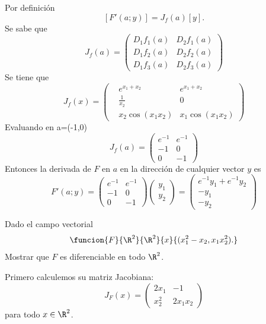 \documentclass[a4,11pt]{aleph-examen}
\begin{document}
\begin{preguntas}
\begin{respuesta}
\begin{respuesta}
\begin{respuesta} 
	Por definición
	\[
        [F'(a;y)]=J_f(a)[y].
    \]
	Se sabe que
    \[
        J_f(a)=\left( \begin{array}{lcr}
        D_{1}f_1(a)    &D_{2}f_1(a) \\
        D_{1}f_2(a)    &D_{2}f_2(a)\\
        D_{1}f_3(a)    &D_{2}f_3(a)
        \end{array}\right) 
    \]
    Se tiene que    
    \[
        J_f(x)= \begin{pmatrix}
        & e^{x_1+x_2}    &e^{x_1+x_2} \\
        & \frac{1}{x_2}  &0\\
        & x_2\cos(x_1x_2)    &x_1\cos(x_1x_2)
        \end{pmatrix} 
    \]
    Evaluando en a=(-1,0)
    \[
        J_f(a)= \begin{pmatrix}
        e^{-1} &e^{-1} \\
        -1     &0\\
        0      &-1
        \end{pmatrix}  
    \]
    Entonces la derivada de $F$ en $a$ en la dirección de cualquier vector $y$  es
    \[
        F'(a;y)= \begin{pmatrix}
        e^{-1} &e^{-1} \\
        -1     &0\\
        0      &-1
        \end{pmatrix}  
        \begin{pmatrix}
        y_1  \\
        y_2  
        \end{pmatrix}= 
        \begin{pmatrix}
        e^{-1}y_1+e^{-1}y_2\\
        -y_1     \\
        -y_2     
        \end{pmatrix} 
    \]
\end{respuesta}


\item 
	Dado el campo vectorial
	\[
		\funcion{F}{\R^2}{\R^2}{x}{(x_1^2-x_2,x_1x_2^2).}
	\]
	Mostrar que $F$ es diferenciable en todo $\R^2$.

\begin{respuesta}
	Primero calculemos su matriz Jacobiana:
	\[
		J_F(x)=
		\begin{pmatrix}
			2x_1&-1\\
			x_2^2&2x_1x_2
		\end{pmatrix}
	\]
	para todo $x\in\R^2$.
    

\end{respuesta}
\end{respuesta}
\end{respuesta}
\end{preguntas}
\end{document}
